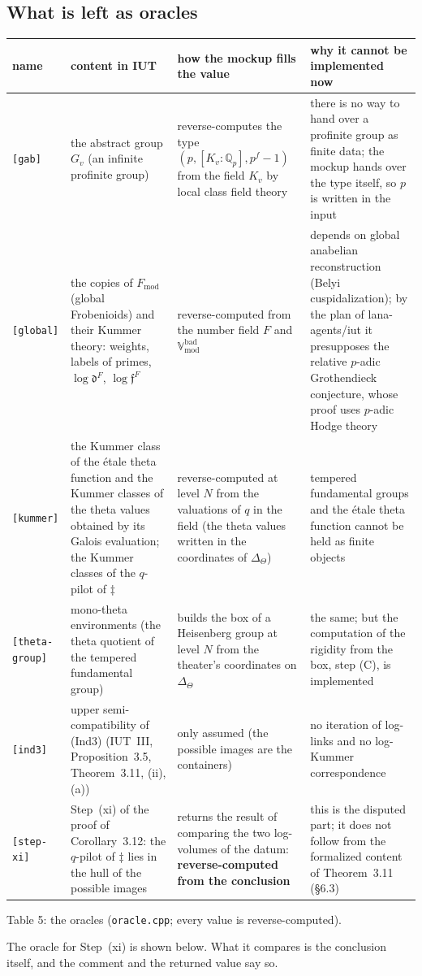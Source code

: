 \documentclass[11pt,a4paper]{article}
\newcommand{\Q}{\mathbb{Q}}
\newcommand{\Vbad}{\mathbb{V}_{\mathrm{mod}}^{\mathrm{bad}}}
\newcommand{\orc}[1]{\texttt{[#1]}}
\newcommand{\lab}[2]{{\upshape\fcolorbox{#1}{#1!8}{\scriptsize\sffamily\bfseries\textcolor{#1}{#2}}}}
\newcommand{\tagP}{\lab{ForestGreen}{P}}
\begin{document}
\subsection{What is left as oracles}
\begin{center}\small
\begin{tabularx}{\textwidth}{@{}>{\raggedright\arraybackslash}p{2.45cm} *{3}{>{\raggedright\arraybackslash}X}@{}}
\toprule
name & content in IUT & how the mockup fills the value & why it cannot be implemented now\\
\midrule
\orc{gab} & the abstract group $G_v$ (an infinite profinite group) & reverse-computes the type
$(p,[K_v:\Q_p],p^f-1)$ from the field $K_v$ by local class field theory & there is no way to hand over a profinite group
as finite data; the mockup hands over the type itself, so $p$ is written in the input\\
\orc{global} & the copies of $F_{\mathrm{mod}}$ (global Frobenioids) and their Kummer theory: weights, labels of
primes, $\log\mathfrak d^F$, $\log\mathfrak f^F$ & reverse-computed from the number field $F$ and $\Vbad$ & depends on
global anabelian reconstruction (Belyi cuspidalization); by the plan of lana-agents/iut it presupposes the relative
$p$-adic Grothendieck conjecture, whose proof uses $p$-adic Hodge theory\\
\orc{kummer} & the Kummer class of the \'etale theta function and the Kummer classes of the theta values obtained by
its Galois evaluation; the Kummer classes of the $q$-pilot of $\ddagger$ & reverse-computed at level $N$ from the
valuations of $q$ in the field (the theta values written in the coordinates of $\Delta_\Theta$) & tempered fundamental
groups and the \'etale theta function cannot be held as finite objects\\
\orc{theta-group} & mono-theta environments (the theta quotient of the tempered fundamental group) & builds the box of
a Heisenberg group at level $N$ from the theater's coordinates on $\Delta_\Theta$ & the same; but the computation of the
rigidity from the box, step (C), is implemented\\
\orc{ind3} & upper semi-compatibility of (Ind3) (IUT~III, Proposition~3.5, Theorem~3.11, (ii), (a)) & only assumed
(the possible images are the containers) & no iteration of log-links and no log-Kummer correspondence\\
\orc{step-xi} & Step~(xi) of the proof of Corollary~3.12: the $q$-pilot of $\ddagger$ lies in the hull of the possible
images & returns the result of comparing the two log-volumes of the datum: \textbf{reverse-computed from the
conclusion} & this is the disputed part; it does not follow from the formalized content of Theorem~3.11 (\S6.3)\\
\bottomrule
\end{tabularx}

\smallskip Table 5: the oracles (\texttt{oracle.cpp}; every value is reverse-computed).
\end{center}
\tagP{} The oracle for Step~(xi) is shown below. What it compares is the conclusion itself, and the comment and the
returned value say so.
\cppstepxi
\end{document}
